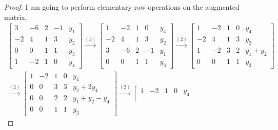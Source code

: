 \begin{proof}
    I am going to perform elementary-row operations on the augmented matrix.
    \begingroup{}
    \allowdisplaybreaks{}
    \begin{align*}
        \left[\begin{array}{cccc|c}
                      3  & -6 & 2 & -1 & y_{1} \\
                      -2 & 4  & 1 & 3  & y_{2} \\
                      0  & 0  & 1 & 1  & y_{3} \\
                      1  & -2 & 1 & 0  & y_{4}
                  \end{array}\right]
        \stackrel{(3)}{\rightarrow}
        \left[\begin{array}{cccc|c}
                      1  & -2 & 1 & 0  & y_{4} \\
                      -2 & 4  & 1 & 3  & y_{2} \\
                      3  & -6 & 2 & -1 & y_{1} \\
                      0  & 0  & 1 & 1  & y_{3}
                  \end{array}\right]
        \stackrel{(2)}{\rightarrow}
        \left[\begin{array}{cccc|c}
                      1  & -2 & 1 & 0 & y_{4}         \\
                      -2 & 4  & 1 & 3 & y_{2}         \\
                      1  & -2 & 3 & 2 & y_{1} + y_{2} \\
                      0  & 0  & 1 & 1 & y_{3}
                  \end{array}\right]                                                                       \\
        \stackrel{(2)}{\rightarrow}
        \left[\begin{array}{cccc|c}
                      1 & -2 & 1 & 0 & y_{4}                 \\
                      0 & 0  & 3 & 3 & y_{2} + 2{y_{4}}      \\
                      0 & 0  & 2 & 2 & y_{1} + y_{2} - y_{4} \\
                      0 & 0  & 1 & 1 & y_{3}
                  \end{array}\right]
        \stackrel{(2)}{\rightarrow}
        \left[\begin{array}{cccc|c}
                      1 & -2 & 1 & 0 & y_{4}                            \\

\end{array}
\end{align*}
\end{proof}
